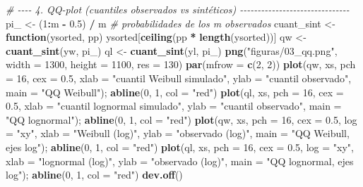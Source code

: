 \documentclass[
  spanish,
]{article}
\newenvironment{Shaded}{\begin{snugshade}}{\end{snugshade}}
\newcommand{\AttributeTok}[1]{\textcolor[rgb]{0.13,0.29,0.53}{#1}}
\newcommand{\CommentTok}[1]{\textcolor[rgb]{0.56,0.35,0.01}{\textit{#1}}}
\newcommand{\ControlFlowTok}[1]{\textcolor[rgb]{0.13,0.29,0.53}{\textbf{#1}}}
\newcommand{\DecValTok}[1]{\textcolor[rgb]{0.00,0.00,0.81}{#1}}
\newcommand{\FloatTok}[1]{\textcolor[rgb]{0.00,0.00,0.81}{#1}}
\newcommand{\FunctionTok}[1]{\textcolor[rgb]{0.13,0.29,0.53}{\textbf{#1}}}
\newcommand{\NormalTok}[1]{#1}
\newcommand{\OtherTok}[1]{\textcolor[rgb]{0.56,0.35,0.01}{#1}}
\newcommand{\SpecialCharTok}[1]{\textcolor[rgb]{0.81,0.36,0.00}{\textbf{#1}}}
\newcommand{\StringTok}[1]{\textcolor[rgb]{0.31,0.60,0.02}{#1}}
\begin{document}
\begin{Shaded}
\begin{Highlighting}[]
\CommentTok{\# {-}{-}{-}{-} 4. QQ{-}plot (cuantiles observados vs sintéticos) {-}{-}{-}{-}{-}{-}{-}{-}{-}{-}{-}{-}{-}{-}{-}{-}{-}{-}{-}{-}{-}{-}{-}{-}{-}{-}{-}{-}{-}{-}{-}}
\NormalTok{pi\_ }\OtherTok{\textless{}{-}}\NormalTok{ (}\DecValTok{1}\SpecialCharTok{:}\NormalTok{m }\SpecialCharTok{{-}} \FloatTok{0.5}\NormalTok{) }\SpecialCharTok{/}\NormalTok{ m                           }\CommentTok{\# probabilidades de los m observados}
\NormalTok{cuant\_sint }\OtherTok{\textless{}{-}} \ControlFlowTok{function}\NormalTok{(ysorted, pp) ysorted[}\FunctionTok{ceiling}\NormalTok{(pp }\SpecialCharTok{*} \FunctionTok{length}\NormalTok{(ysorted))]}
\NormalTok{qw }\OtherTok{\textless{}{-}} \FunctionTok{cuant\_sint}\NormalTok{(yw, pi\_)}
\NormalTok{ql }\OtherTok{\textless{}{-}} \FunctionTok{cuant\_sint}\NormalTok{(yl, pi\_)}
\FunctionTok{png}\NormalTok{(}\StringTok{"figuras/03\_qq.png"}\NormalTok{, }\AttributeTok{width =} \DecValTok{1300}\NormalTok{, }\AttributeTok{height =} \DecValTok{1100}\NormalTok{, }\AttributeTok{res =} \DecValTok{130}\NormalTok{)}
\FunctionTok{par}\NormalTok{(}\AttributeTok{mfrow =} \FunctionTok{c}\NormalTok{(}\DecValTok{2}\NormalTok{, }\DecValTok{2}\NormalTok{))}
\FunctionTok{plot}\NormalTok{(qw, xs, }\AttributeTok{pch =} \DecValTok{16}\NormalTok{, }\AttributeTok{cex =} \FloatTok{0.5}\NormalTok{, }\AttributeTok{xlab =} \StringTok{"cuantil Weibull simulado"}\NormalTok{, }\AttributeTok{ylab =} \StringTok{"cuantil observado"}\NormalTok{,}
     \AttributeTok{main =} \StringTok{"QQ Weibull"}\NormalTok{); }\FunctionTok{abline}\NormalTok{(}\DecValTok{0}\NormalTok{, }\DecValTok{1}\NormalTok{, }\AttributeTok{col =} \StringTok{"red"}\NormalTok{)}
\FunctionTok{plot}\NormalTok{(ql, xs, }\AttributeTok{pch =} \DecValTok{16}\NormalTok{, }\AttributeTok{cex =} \FloatTok{0.5}\NormalTok{, }\AttributeTok{xlab =} \StringTok{"cuantil lognormal simulado"}\NormalTok{, }\AttributeTok{ylab =} \StringTok{"cuantil observado"}\NormalTok{,}
     \AttributeTok{main =} \StringTok{"QQ lognormal"}\NormalTok{); }\FunctionTok{abline}\NormalTok{(}\DecValTok{0}\NormalTok{, }\DecValTok{1}\NormalTok{, }\AttributeTok{col =} \StringTok{"red"}\NormalTok{)}
\FunctionTok{plot}\NormalTok{(qw, xs, }\AttributeTok{pch =} \DecValTok{16}\NormalTok{, }\AttributeTok{cex =} \FloatTok{0.5}\NormalTok{, }\AttributeTok{log =} \StringTok{"xy"}\NormalTok{, }\AttributeTok{xlab =} \StringTok{"Weibull (log)"}\NormalTok{, }\AttributeTok{ylab =} \StringTok{"observado (log)"}\NormalTok{,}
     \AttributeTok{main =} \StringTok{"QQ Weibull, ejes log"}\NormalTok{); }\FunctionTok{abline}\NormalTok{(}\DecValTok{0}\NormalTok{, }\DecValTok{1}\NormalTok{, }\AttributeTok{col =} \StringTok{"red"}\NormalTok{)}
\FunctionTok{plot}\NormalTok{(ql, xs, }\AttributeTok{pch =} \DecValTok{16}\NormalTok{, }\AttributeTok{cex =} \FloatTok{0.5}\NormalTok{, }\AttributeTok{log =} \StringTok{"xy"}\NormalTok{, }\AttributeTok{xlab =} \StringTok{"lognormal (log)"}\NormalTok{, }\AttributeTok{ylab =} \StringTok{"observado (log)"}\NormalTok{,}
     \AttributeTok{main =} \StringTok{"QQ lognormal, ejes log"}\NormalTok{); }\FunctionTok{abline}\NormalTok{(}\DecValTok{0}\NormalTok{, }\DecValTok{1}\NormalTok{, }\AttributeTok{col =} \StringTok{"red"}\NormalTok{)}
\FunctionTok{dev.off}\NormalTok{()}


\end{Highlighting}
\end{Shaded}
\end{document}
